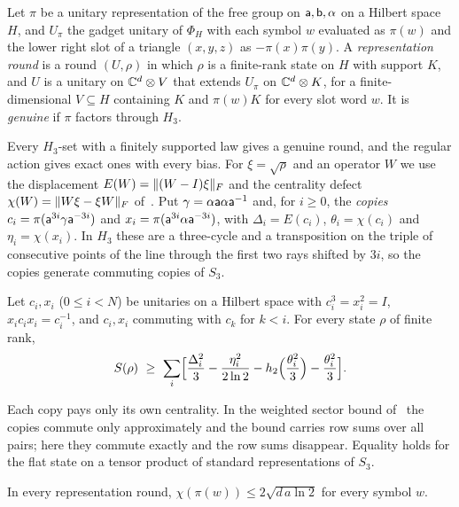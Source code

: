 \begin{definition}\label{def:genuine}
Let $\pi$ be a unitary representation of the free group on $\mathsf a,\mathsf b,\alpha$ on a Hilbert space $H$, and $U_\pi$ the gadget unitary of $\Phi_H$
with each symbol $w$ evaluated as $\pi(w)$ and the lower right slot of a triangle $(x,y,z)$ as $-\pi(x)\pi(y)$. A \emph{representation round} is a
round $(U,\rho)$ in which $\rho$ is a finite-rank state on $H$ with support $K$, and $U$ is a unitary on $\mathbb C^d\otimes V$ that extends $U_\pi$ on
$\mathbb C^d\otimes K$, for a finite-dimensional $V\subseteq H$ containing $K$ and $\pi(w)K$ for every slot word $w$. It is \emph{genuine} if $\pi$ factors
through $H_3$.
\end{definition}

Every $H_3$-set with a finitely supported law gives a genuine round, and the regular action gives exact ones with every bias. For $\xi=\sqrt\rho$ and
an operator $W$ we use the displacement $E(W)=\lVert (W-I)\xi\rVert_F$ and the centrality defect $\chi(W)=\lVert W\xi-\xi W\rVert_F$
of~\cite[Appendix~C.1]{DouglasMghirbiC}. Put $\gamma=\alpha\mathsf a\alpha\mathsf a^{-1}$ and, for $i\ge0$, the \emph{copies}
$c_i=\pi(\mathsf a^{3i}\gamma\mathsf a^{-3i})$ and $x_i=\pi(\mathsf a^{3i}\alpha\mathsf a^{-3i})$, with $\Delta_i=E(c_i)$, $\theta_i=\chi(c_i)$ and $\eta_i=\chi(x_i)$. In
$H_3$ these are a three-cycle and a transposition on the triple of consecutive points of the line through the first two rays shifted by
$3i$, so the copies generate commuting copies of $S_3$.

\begin{lemma}\label{lem:sector}
Let $c_i,x_i$ ($0\le i<N$) be unitaries on a Hilbert space with $c_i^3=x_i^2=I$, $x_ic_ix_i=c_i^{-1}$, and $c_i,x_i$ commuting with $c_k$ for
$k<i$. For every state $\rho$ of finite rank,
\[
S(\rho)\ \ge\ \sum_i\Bigl[\frac{\Delta_i^2}3-\frac{\eta_i^2}{2\ln2}-h_2\Bigl(\frac{\theta_i^2}3\Bigr)-\frac{\theta_i^2}3\Bigr].
\]
\end{lemma}

Each copy pays only its own centrality. In the weighted sector bound of~\cite[Theorem~C.6]{DouglasMghirbiC} the copies commute only approximately
and the bound carries row sums over all pairs; here they commute exactly and the row sums disappear. Equality holds for the flat state on a tensor
product of standard representations of $S_3$.

\begin{lemma}\label{lem:centrality}
In every representation round, $\chi(\pi(w))\le2\sqrt{d\,a\ln2}$ for every symbol $w$.
\end{lemma}

